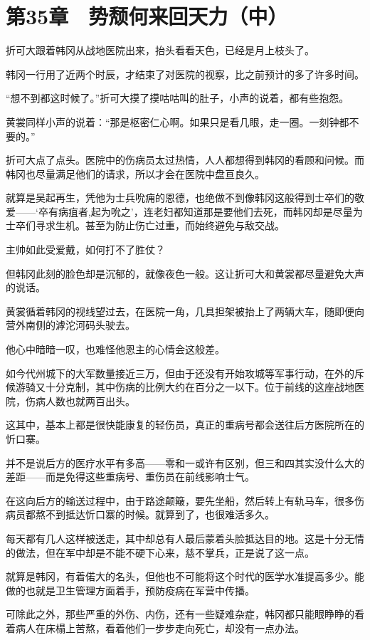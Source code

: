 \section{第35章　势颓何来回天力（中）}

折可大跟着韩冈从战地医院出来，抬头看看天色，已经是月上枝头了。

韩冈一行用了近两个时辰，才结束了对医院的视察，比之前预计的多了许多时间。

“想不到都这时候了。”折可大摸了摸咕咕叫的肚子，小声的说着，都有些抱怨。

黄裳同样小声的说着：“那是枢密仁心啊。如果只是看几眼，走一圈。一刻钟都不要的。”

折可大点了点头。医院中的伤病员太过热情，人人都想得到韩冈的看顾和问候。而韩冈也尽量满足他们的请求，所以才会在医院中盘亘良久。

就算是吴起再生，凭他为士兵吮痈的恩德，也绝做不到像韩冈这般得到士卒们的敬爱——‘卒有病疽者,起为吮之’，连老妇都知道那是要他们去死，而韩冈却是尽量为士卒们寻求生机。甚至为防止伤亡过重，而始终避免与敌交战。

主帅如此受爱戴，如何打不了胜仗？

但韩冈此刻的脸色却是沉郁的，就像夜色一般。这让折可大和黄裳都尽量避免大声的说话。

黄裳循着韩冈的视线望过去，在医院一角，几具担架被抬上了两辆大车，随即便向营外南侧的滹沱河码头驶去。

他心中暗暗一叹，也难怪他恩主的心情会这般差。

如今代州城下的大军数量接近三万，但由于还没有开始攻城等军事行动，在外的斥候游骑又十分克制，其中伤病的比例大约在百分之一以下。位于前线的这座战地医院，伤病人数也就两百出头。

这其中，基本上都是很快能康复的轻伤员，真正的重病号都会送往后方医院所在的忻口寨。

并不是说后方的医疗水平有多高——零和一或许有区别，但三和四其实没什么大的差距——而是免得这些重病号、重伤员在前线影响士气。

在这向后方的输送过程中，由于路途颠簸，要先坐船，然后转上有轨马车，很多伤病员都熬不到抵达忻口寨的时候。就算到了，也很难活多久。

每天都有几人这样被送走，其中却总有人最后蒙着头脸抵达目的地。这是十分无情的做法，但在军中却是不能不硬下心来，慈不掌兵，正是说了这一点。

就算是韩冈，有着偌大的名头，但他也不可能将这个时代的医学水准提高多少。能做的也就是卫生管理方面着手，预防疫病在军营中传播。

可除此之外，那些严重的外伤、内伤，还有一些疑难杂症，韩冈都只能眼睁睁的看着病人在床榻上苦熬，看着他们一步步走向死亡，却没有一点办法。

